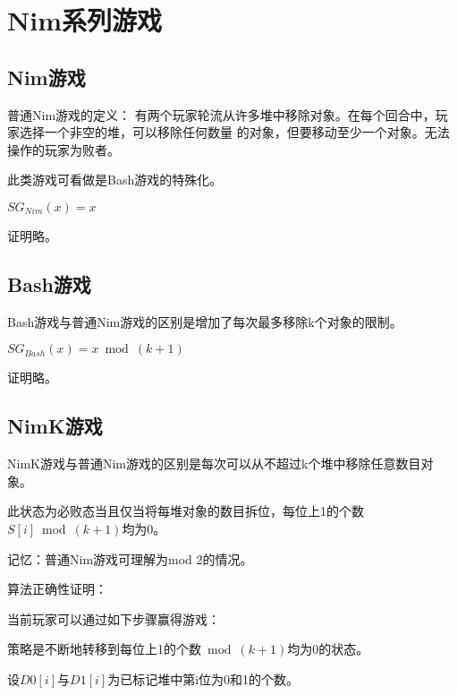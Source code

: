 \section{Nim系列游戏}

\subsection{Nim游戏}


普通Nim游戏的定义：
有两个玩家轮流从许多堆中移除对象。在每个回合中，玩家选择一个非空的堆，可以移除任何数量
的对象，但要移动至少一个对象。无法操作的玩家为败者。

此类游戏可看做是Bash游戏的特殊化。

\begin{theorem}
	$SG_{Nim}(x)=x$
\end{theorem}

证明略。

\subsection{Bash游戏}


Bash游戏与普通Nim游戏的区别是增加了每次最多移除k个对象的限制。

\begin{theorem}
	$SG_{Bash}(x)=x \bmod (k+1)$
\end{theorem}

证明略。

\subsection{NimK游戏}


NimK游戏与普通Nim游戏的区别是每次可以从不超过k个堆中移除任意数目对象。

\begin{theorem}\label{NimK}
	此状态为必败态当且仅当将每堆对象的数目拆位，每位上1的个数$S[i] \bmod (k+1)$均为0。
\end{theorem}

记忆：普通Nim游戏可理解为mod 2的情况。

算法正确性证明：

当前玩家可以通过如下步骤赢得游戏：

策略是不断地转移到每位上1的个数$\bmod (k+1)$均为0的状态。

设$D0[i]$与$D1[i]$为已标记堆中第i位为0和1的个数。

